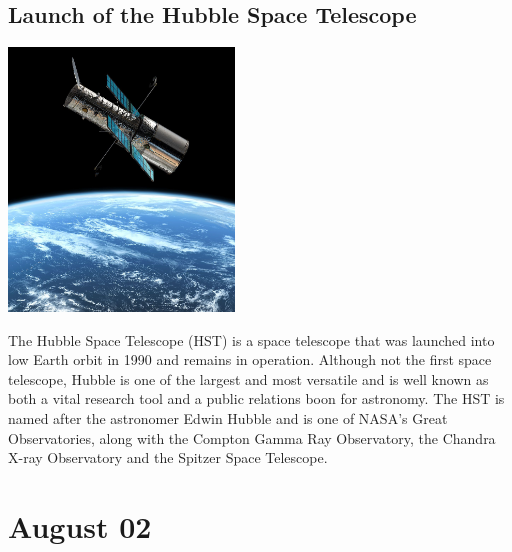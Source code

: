\documentclass[11pt]{report}
\begin{document}
\subsection{Launch of the Hubble Space Telescope}
\vspace{2mm}\begin{center}\includegraphics[width=6cm]{./img/hubble.jpg}\end{center}
The Hubble Space Telescope (HST) is a space telescope that was launched into low Earth orbit in 1990 and remains in operation. Although not the first space telescope, Hubble is one of the largest and most versatile and is well known as both a vital research tool and a public relations boon for astronomy. The HST is named after the astronomer Edwin Hubble and is one of NASA's Great Observatories, along with the Compton Gamma Ray Observatory, the Chandra X-ray Observatory and the Spitzer Space Telescope.
\section{August 02}
\end{document}
